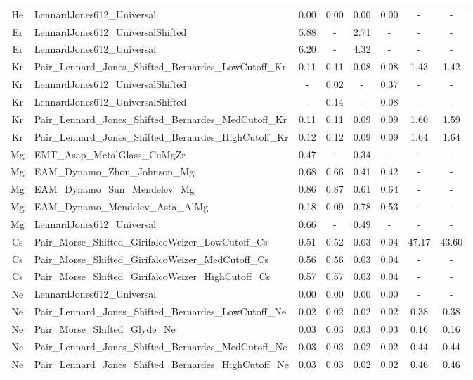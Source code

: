 \documentclass[%
 reprint,
 amsmath,amssymb,
 aps,
]{revtex4-1}
\begin{document}
\begin{longtable*}{@{\extracolsep{\fill}} c l c c c c c c}
 He & LennardJones612\_Universal & 0.00 & 0.00 & 0.00 & 0.00 & - & - \\
 Er & LennardJones612\_UniversalShifted & 5.88 & - & 2.71 & - & - & - \\
 Er & LennardJones612\_Universal & 6.20 & - & 4.32 & - & - & - \\
 Kr & Pair\_Lennard\_Jones\_Shifted\_Bernardes\_LowCutoff\_Kr & 0.11 & 0.11 & 0.08 & 0.08 & 1.43 & 1.42 \\
 Kr & LennardJones612\_UniversalShifted & - & 0.02 & - & 0.37 & - & - \\
 Kr & LennardJones612\_UniversalShifted & - & 0.14 & - & 0.08 & - & - \\
 Kr & Pair\_Lennard\_Jones\_Shifted\_Bernardes\_MedCutoff\_Kr & 0.11 & 0.11 & 0.09 & 0.09 & 1.60 & 1.59 \\
 Kr & Pair\_Lennard\_Jones\_Shifted\_Bernardes\_HighCutoff\_Kr & 0.12 & 0.12 & 0.09 & 0.09 & 1.64 & 1.64 \\
 Mg & EMT\_Asap\_MetalGlass\_CuMgZr & 0.47 & - & 0.34 & - & - & - \\
 Mg & EAM\_Dynamo\_Zhou\_Johnson\_Mg & 0.68 & 0.66 & 0.41 & 0.42 & - & - \\
 Mg & EAM\_Dynamo\_Sun\_Mendelev\_Mg & 0.86 & 0.87 & 0.61 & 0.64 & - & - \\
 Mg & EAM\_Dynamo\_Mendelev\_Asta\_AlMg & 0.18 & 0.09 & 0.78 & 0.53 & - & - \\
 Mg & LennardJones612\_Universal & 0.66 & - & 0.49 & - & - & - \\
 Cs & Pair\_Morse\_Shifted\_GirifalcoWeizer\_LowCutoff\_Cs & 0.51 & 0.52 & 0.03 & 0.04 & 47.17 & 43.60 \\
 Cs & Pair\_Morse\_Shifted\_GirifalcoWeizer\_MedCutoff\_Cs & 0.56 & 0.56 & 0.03 & 0.04 & - & - \\
 Cs & Pair\_Morse\_Shifted\_GirifalcoWeizer\_HighCutoff\_Cs & 0.57 & 0.57 & 0.03 & 0.04 & - & - \\
 Ne & LennardJones612\_Universal & 0.00 & 0.00 & 0.00 & 0.00 & - & - \\
 Ne & Pair\_Lennard\_Jones\_Shifted\_Bernardes\_LowCutoff\_Ne & 0.02 & 0.02 & 0.02 & 0.02 & 0.38 & 0.38 \\
 Ne & Pair\_Morse\_Shifted\_Glyde\_Ne & 0.03 & 0.03 & 0.03 & 0.03 & 0.16 & 0.16 \\
 Ne & Pair\_Lennard\_Jones\_Shifted\_Bernardes\_MedCutoff\_Ne & 0.03 & 0.03 & 0.02 & 0.02 & 0.44 & 0.44 \\
 Ne & Pair\_Lennard\_Jones\_Shifted\_Bernardes\_HighCutoff\_Ne & 0.03 & 0.03 & 0.02 & 0.02 & 0.46 & 0.46 \\

\end{longtable*}
\end{document}
